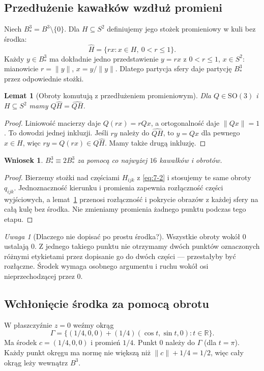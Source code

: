 \documentclass[11pt,a4paper]{article}
\numberwithin{equation}{section}
\theoremstyle{plain}
\newtheorem{lemat}[twierdzenie]{Lemat}
\newtheorem{wniosek}[twierdzenie]{Wniosek}
\theoremstyle{definition}
\theoremstyle{remark}
\newtheorem{uwaga}[twierdzenie]{Uwaga}
\newcommand{\R}{\mathbb R}
\begin{document}
\subsection{Przedłużenie kawałków wzdłuż promieni}
Niech $B^3_*=B^3\setminus\{0\}$. Dla $H\subseteq S^2$ definiujemy jego stożek promieniowy w kuli bez środka:
\[
 \widehat H=\{rx:x\in H,\ 0<r\le1\}.
\]
Każdy $y\in B^3_*$ ma dokładnie jedno przedstawienie $y=rx$ z $0<r\le1$, $x\in S^2$: mianowicie $r=\|y\|$, $x=y/\|y\|$. Dlatego partycja sfery daje partycję $B^3_*$ przez odpowiednie stożki.
\begin{lemat}[Obroty komutują z przedłużeniem promieniowym]\label{lem:stozki}
Dla $Q\in\mathrm{SO}(3)$ i $H\subseteq S^2$ mamy $Q\widehat H=\widehat{QH}$.
\end{lemat}
\begin{proof}
Liniowość macierzy daje $Q(rx)=rQx$, a ortogonalność daje $\|Qx\|=1$. To dowodzi jednej inkluzji. Jeśli $ry$ należy do $\widehat{QH}$, to $y=Qx$ dla pewnego $x\in H$, więc $ry=Q(rx)\in Q\widehat H$. Mamy także drugą inkluzję.
\end{proof}
\begin{wniosek}\label{wn:kula-bez-srodka}
$B^3_*\equiv2B^3_*$ za pomocą co najwyżej $16$ kawałków i obrotów.
\end{wniosek}
\begin{proof}
Bierzemy stożki nad częściami $H_{ijk}$ z \eqref{eq:7-2} i stosujemy te same obroty $q_{ijk}$. Jednoznaczność kierunku i promienia zapewnia rozłączność części wyjściowych, a lemat~\ref{lem:stozki} przenosi rozłączność i pokrycie obrazów z każdej sfery na całą kulę bez środka. Nie zmieniamy promienia żadnego punktu podczas tego etapu.
\end{proof}
\begin{uwaga}[Dlaczego nie dopisać po prostu środka?]
Wszystkie obroty wokół $0$ ustalają $0$. Z jednego takiego punktu nie otrzymamy dwóch punktów oznaczonych różnymi etykietami przez dopisanie go do dwóch części --- przestałyby być rozłączne. Środek wymaga osobnego argumentu i ruchu wokół osi nieprzechodzącej przez $0$.
\end{uwaga}

\subsection{Wchłonięcie środka za pomocą obrotu}
W płaszczyźnie $z=0$ weźmy okrąg
\[
 \Gamma=\{(1/4,0,0)+(1/4)(\cos t,\sin t,0):t\in\R\}.
\]
Ma środek $c=(1/4,0,0)$ i promień $1/4$. Punkt $0$ należy do $\Gamma$ (dla $t=\pi$). Każdy punkt okręgu ma normę nie większą niż $\|c\|+1/4=1/2$, więc cały okrąg leży wewnątrz $B^3$.
\end{document}
